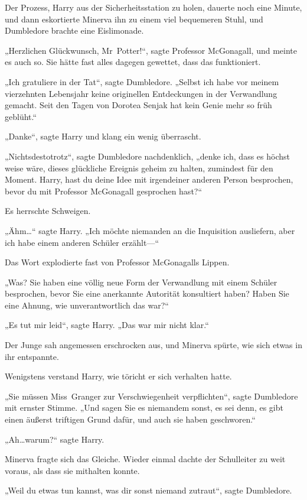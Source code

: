 {Der Prozess, Harry aus der Sicherheitsstation zu holen, dauerte noch eine Minute, und dann eskortierte Minerva ihn zu einem viel bequemeren Stuhl, und Dumbledore brachte eine Eislimonade.

„Herzlichen Glückwunsch, Mr~Potter!“, sagte Professor McGonagall, und meinte es auch so. Sie hätte fast alles dagegen gewettet, dass das funktioniert.

„Ich gratuliere in der Tat“, sagte Dumbledore. „Selbst ich habe vor meinem vierzehnten Lebensjahr keine originellen Entdeckungen in der Verwandlung gemacht. Seit den Tagen von Dorotea Senjak hat kein Genie mehr so früh geblüht.“

„Danke“, sagte Harry und klang ein wenig überrascht.

„Nichtsdestotrotz“, sagte Dumbledore nachdenklich, „denke ich, dass es höchst weise wäre, dieses glückliche Ereignis geheim zu halten, zumindest für den Moment. Harry, hast du deine Idee mit irgendeiner anderen Person besprochen, bevor du mit Professor McGonagall gesprochen hast?“

Es herrschte Schweigen.

„Ähm…“ sagte Harry. „Ich möchte niemanden an die Inquisition ausliefern, aber ich habe einem anderen Schüler erzählt—“

Das Wort explodierte fast von Professor McGonagalls Lippen.

„Was? Sie haben eine völlig neue Form der Verwandlung mit einem Schüler besprochen, bevor Sie eine anerkannte Autorität konsultiert haben? Haben Sie eine Ahnung, wie unverantwortlich das war?“

„Es tut mir leid“, sagte Harry. „Das war mir nicht klar.“

Der Junge sah angemessen erschrocken aus, und Minerva spürte, wie sich etwas in ihr entspannte.

Wenigstens verstand Harry, wie töricht er sich verhalten hatte.

„Sie müssen Miss~Granger zur Verschwiegenheit verpflichten“, sagte Dumbledore mit ernster Stimme. „Und sagen Sie es niemandem sonst, es sei denn, es gibt einen äußerst triftigen Grund dafür, und auch sie haben geschworen.“

„Ah…warum?“ sagte Harry.

Minerva fragte sich das Gleiche. Wieder einmal dachte der Schulleiter zu weit voraus, als dass sie mithalten konnte.

„Weil du etwas tun kannst, was dir sonst niemand zutraut“, sagte Dumbledore.

}
